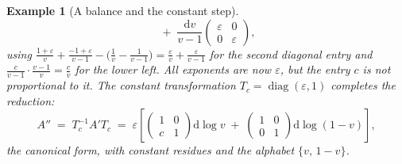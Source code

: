 \documentclass[11pt]{article}
\newcommand{\eps}{\varepsilon}
\newcommand{\dd}{\mathrm{d}}
\newtheorem{example}[definition]{Example}
\begin{document}
\begin{example}[A balance and the constant step]
\begin{equation}
  \;+\;
  \frac{\dd v}{v-1}
  \begin{pmatrix} \eps & 0\\ 0 & \eps\end{pmatrix} ,
\end{equation}
using $\frac{1+\eps}{v} + \frac{-1+\eps}{v-1}
- \big(\frac1v - \frac1{v-1}\big) = \frac{\eps}{v} +
\frac{\eps}{v-1}$ for the second diagonal entry and
$\frac{c}{v-1}\cdot\frac{v-1}{v} = \frac{c}{v}$ for the lower left.
All exponents are now $\eps$, but the entry $c$ is not proportional
to it.  The constant transformation
$T_c = \operatorname{diag}(\eps, 1)$ completes the reduction:
\begin{equation}
  A'' \;=\; T_c^{-1}A'T_c \;=\; \eps\left[
  \begin{pmatrix} 1 & 0\\ c & 1\end{pmatrix}\dd\log v
  \;+\;
  \begin{pmatrix} 1 & 0\\ 0 & 1\end{pmatrix}\dd\log(1-v)
  \right] ,
\end{equation}
the canonical form, with constant residues and the alphabet
$\{v,\,1-v\}$.
\end{example}
\end{document}
